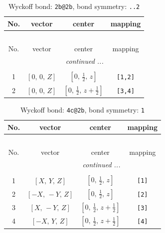 \documentclass[fleqn,8pt]{jsarticle}
\begin{document}
\renewcommand{\arraystretch}{1.2}
\begin{longtable}{cccc}
\caption{Wyckoff bond: {\tt 2b@2b}, bond symmetry: {\tt ..2}}
 \\
 \hline \hline
No. & vector & center & mapping \\ \hline \endfirsthead

\multicolumn{3}{l}{\tablename\ \thetable{}} \\
 \hline \hline
No. & vector & center & mapping \\ \hline \endhead

 \hline \hline
\multicolumn{3}{r}{\footnotesize\it continued ...} \\ \endfoot

 \hline \hline
\multicolumn{3}{r}{} \\ \endlastfoot

1 & $\left[ 0,\, 0,\, Z \right]$ & $\left[ 0,\, \frac{1}{2},\, z \right]$ & {\tt [1,2]} \\ \hline
2 & $\left[ 0,\, 0,\, Z \right]$ & $\left[ 0,\, \frac{1}{2},\, z + \frac{1}{2} \right]$ & {\tt [3,4]} \\
\end{longtable}
\renewcommand{\arraystretch}{1.2}
\begin{longtable}{cccc}
\caption{Wyckoff bond: {\tt 4c@2b}, bond symmetry: {\tt 1}}
 \\
 \hline \hline
No. & vector & center & mapping \\ \hline \endfirsthead

\multicolumn{3}{l}{\tablename\ \thetable{}} \\
 \hline \hline
No. & vector & center & mapping \\ \hline \endhead

 \hline \hline
\multicolumn{3}{r}{\footnotesize\it continued ...} \\ \endfoot

 \hline \hline
\multicolumn{3}{r}{} \\ \endlastfoot

1 & $\left[ X,\, Y,\, Z \right]$ & $\left[ 0,\, \frac{1}{2},\, z \right]$ & {\tt [1]} \\ \hline
2 & $\left[ - X,\, - Y,\, Z \right]$ & $\left[ 0,\, \frac{1}{2},\, z \right]$ & {\tt [2]} \\ \hline
3 & $\left[ X,\, - Y,\, Z \right]$ & $\left[ 0,\, \frac{1}{2},\, z + \frac{1}{2} \right]$ & {\tt [3]} \\ \hline
4 & $\left[ - X,\, Y,\, Z \right]$ & $\left[ 0,\, \frac{1}{2},\, z + \frac{1}{2} \right]$ & {\tt [4]} \\
\end{longtable}
\end{document}
